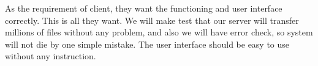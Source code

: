 As the requirement of client, they want the functioning and user interface correctly. This is all they want. We will make test that our server will transfer millions of files without any problem, and also we will have error check, so system will not die by one simple mistake.  The user interface should be easy to use without any instruction. 
